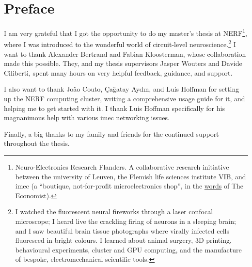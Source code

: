 \chapter*{Preface}
\label{sec:preface}


I am very grateful that I got the opportunity to do my master's thesis at NERF\footnote{Neuro-Electronics Research Flanders. A collaborative research initiative between the university of Leuven, the Flemish life sciences institute VIB, and imec (a ``boutique, not-for-profit microelectronics shop'', in the \href{https://www.economist.com/science-and-technology/2017/11/09/a-new-nerve-cell-monitor-will-help-those-studying-brains}{words} of The Economist).}, where I was introduced to the wonderful world of circuit-level neuroscience.\footnote{I watched the fluorescent neural fireworks through a laser confocal microscope; I heard live the crackling firing of neurons in a sleeping brain; and I saw beautiful brain tissue photographs where virally infected cells fluoresced in bright colours. I learned about animal surgery, 3D printing, behavioural experiments, cluster and GPU computing, and the manufacture of bespoke, electromechanical scientific tools.}
I want to thank Alexander Bertrand and Fabian Kloosterman, whose collaboration made this possible. They, and my thesis supervisors Jasper Wouters and Davide Ciliberti, spent many hours on very helpful feedback, guidance, and support.

I also want to thank Jo\~ao Couto, \c{C}a\u{g}atay Ayd{\i}n, and Luis Hoffman for setting up the NERF computing cluster, writing a comprehensive usage guide for it, and helping me to get started with it. I thank Luis Hoffman specifically for his magnanimous help with various imec networking issues.

Finally, a big thanks to my family and friends for the continued support throughout the thesis.

